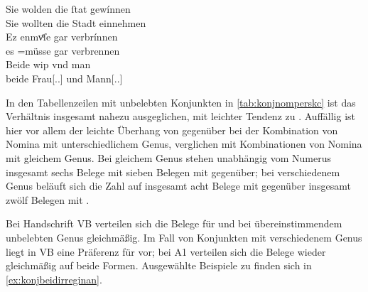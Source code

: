 \begin{exe}
\begin{xlist}
	\ex \label{ex:konjmixbeide2_4}
		\gll Sie wolden die ſtat gewínnen \\
			Sie wollten die Stadt einnehmen \\
	\sn \gll Ez enmvͤſe gar verbrínnen \\
			es \Neg=müsse gar verbrennen \\
	\sn \gll Beide wip vnd man \\
			beide Frau[\Nom.\Pl.\NeutF] und Mann[\Nom.\Pl.\MascM] \\
		\begin{taggedline}{\parencites[\pno~21vb,7--8]{kc:VB}[vgl.~abweichend][4379--4381]{schroeder1895}}
		\trans {}
		\end{taggedline}
	\end{xlist}
\end{exe}

In den Tabellenzeilen mit unbelebten Konjunkten in \cref{tab:konjnomperskc} ist
das Verhältnis insgesamt nahezu ausgeglichen, mit leichter Tendenz zu
. Auffällig ist hier vor allem der leichte Überhang von
 gegenüber  bei der Kombination von Nomina mit
unterschiedlichem Genus,
verglichen mit Kombinationen von Nomina
mit gleichem Genus. Bei gleichem Genus stehen unabhängig vom Numerus insgesamt
sechs Belege mit  sieben Belegen mit  gegenüber; bei
verschiedenem Genus beläuft sich die Zahl auf insgesamt acht Belege mit
 gegenüber insgesamt zwölf Belegen mit .


Bei Handschrift VB verteilen sich die Belege für  und
 bei übereinstimmendem unbelebten Genus gleichmäßig. Im Fall von
Konjunkten mit verschiedenem Genus liegt in VB eine Präferenz für
 vor; bei A1 verteilen sich die Belege wieder
gleichmäßig auf beide Formen. Ausgewählte Beispiele zu 
finden sich in \cref{ex:konjbeidirreginan}.

